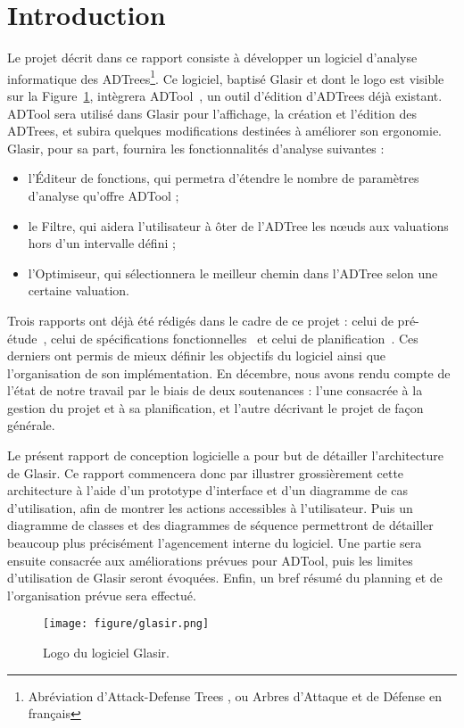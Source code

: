\section{Introduction}
    \label{sec:intro}

    Le projet décrit dans ce rapport consiste à développer un logiciel d'analyse informatique des ADTrees\footnote{Abréviation d'\og Attack-Defense Trees \fg{}, ou \og Arbres d'Attaque et de Défense\fg{} en français}. Ce logiciel, baptisé Glasir et dont le logo est visible sur la {\sc Figure}~\ref{fig:glasir}, intègrera ADTool~\cite{ADTool}, un outil d'édition d'ADTrees déjà existant. ADTool sera utilisé dans Glasir pour l'affichage, la création et l'édition des ADTrees, et subira quelques modifications destinées à améliorer son ergonomie. Glasir, pour sa part, fournira les fonctionnalités d'analyse suivantes :

    \begin{itemize}
    	\item l'Éditeur de fonctions, qui permetra d'étendre le nombre de paramètres d'analyse qu'offre ADTool ;
    	\item le Filtre, qui aidera l'utilisateur à ôter de l'ADTree les nœuds aux valuations hors d'un intervalle défini ;
    	\item l'Optimiseur, qui sélectionnera le meilleur chemin dans l'ADTree selon une certaine valuation.
    \end{itemize} 

    Trois rapports ont déjà été rédigés dans le cadre de ce projet : celui de pré-étude~\cite{pre_etude}, celui de spécifications fonctionnelles~\cite{spec_fonc} et celui de planification~\cite{planif}. Ces derniers ont permis de mieux définir les objectifs du logiciel ainsi que l'organisation de son implémentation. En décembre, nous avons rendu compte de l'état de notre travail par le biais de deux soutenances : l'une consacrée à la gestion du projet et à sa planification, et l'autre décrivant le projet de façon générale. 

    Le présent rapport de conception logicielle a pour but de détailler l'architecture de Glasir. Ce rapport commencera donc par illustrer grossièrement cette architecture à l'aide d'un prototype d'interface et d'un diagramme de cas d'utilisation, afin de montrer les actions accessibles à l'utilisateur. Puis un diagramme de classes et des diagrammes de séquence permettront de détailler beaucoup plus précisément l'agencement interne du logiciel. Une partie sera ensuite consacrée aux améliorations prévues pour ADTool, puis les limites d'utilisation de Glasir seront évoquées. Enfin, un bref résumé du planning et de l'organisation prévue sera effectué.

    \vspace{4mm}

    \begin{figure}[H]
        \centering
        \texttt{[image: figure/glasir.png]}
        \caption{Logo du logiciel Glasir.}
        \label{fig:glasir}
    \end{figure}
